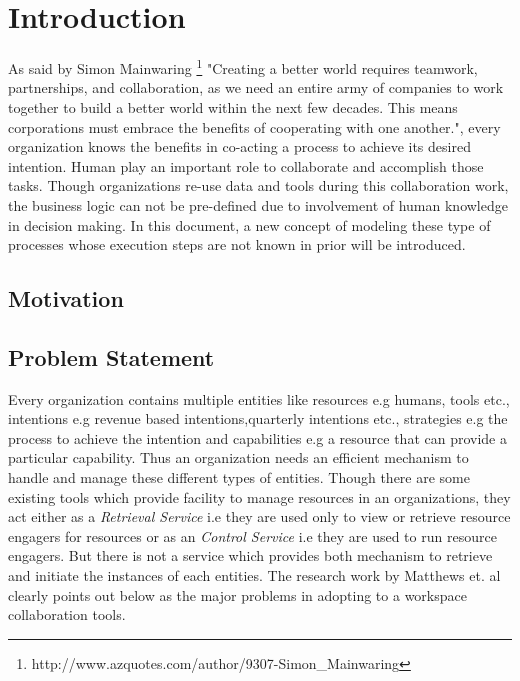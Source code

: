 \chapter{Introduction}
\label{chap:introduction}

As said by Simon Mainwaring  \footnote{http://www.azquotes.com/author/9307-Simon\_Mainwaring}  "Creating a better world requires teamwork, partnerships, and collaboration, as we need an entire army of companies to work together to build a better world within the next few decades. This means corporations must embrace the benefits of cooperating with one another.", every organization knows the benefits in co-acting a process to achieve its desired intention. Human play an important role to collaborate and accomplish those tasks. Though organizations re-use data and tools during this collaboration work, the business logic can not be pre-defined due to involvement of human knowledge in decision making\cite{Sungur2014}. In this document, a new concept of modeling these type of processes whose execution steps are not known in prior will be introduced.


\section{Motivation}
\label{sec:motivation}

  


\section{Problem Statement}
\label{sec:problemstatement}
 Every organization contains multiple entities like resources e.g humans, tools etc., intentions e.g revenue based intentions,quarterly intentions etc., strategies e.g the process to achieve the intention and capabilities e.g a resource that can provide a particular capability. Thus an organization needs an efficient mechanism to handle and manage these different types of entities. Though there are some existing tools which provide facility to manage resources in an organizations, they act either as a \textit{Retrieval Service} i.e they are used only to view or retrieve resource engagers for resources or as an \textit{Control Service} i.e they are used to run resource engagers. But there is not a service which provides both mechanism to retrieve and initiate the instances of each entities. The research work by Matthews et. al \cite{Matthews2011}  clearly points out below as the major problems in adopting to a workspace collaboration tools.

